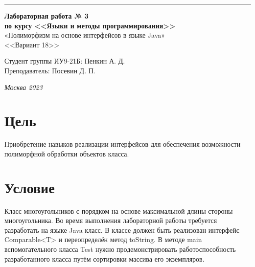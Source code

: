 \documentclass[a4paper, 12pt]{extarticle}
\begin{document}
\begin{titlepage}
\vspace*{-16pt}
\hspace{30pt}\rule{0.866\textwidth}{0.4pt}
  
\vspace{6em}

\begin{center}
\Large {\bf Лабораторная работа № 3} \\ 
\large {\bf по курсу <<Языки и методы программирования>>} \\ 
\large «Полиморфизм на основе интерфейсов в языке Java» \\
\large <<Вариант 18>>
\end{center}\normalsize

\vspace{15em}


\begin{flushright}
  {Студент группы ИУ9-21Б: Пенкин А. Д.\hspace*{15pt} \\
  \vspace{2ex}
  Преподаватель: Посевин Д. П.\hspace*{15pt}}
\end{flushright}

\bigskip

\vfill
 \vspace{7em}

\begin{center}
\textsl{Москва 2023}
\end{center}
\end{titlepage}

\renewcommand{\ttdefault}{pcr}

\setlength{\tabcolsep}{3pt}
\newpage
\setcounter{page}{2}

\section{Цель}\label{Sect::task}
\par
Приобретение навыков реализации интерфейсов для обеспечения возможности
полиморфной обработки объектов класса. 
\section{Условие}
Класс многоугольников с порядком на основе максимальной длины
стороны многоугольника. Во время выполнения лабораторной работы требуется разработать на языке Java класс. В классе должен быть реализован интерфейс Comparable<T> и переопределён метод toString. В методе main вспомогательного класса Test нужно продемонстрировать работоспособность разработанного класса путём сортировки массива его экземпляров.
\end{document}
